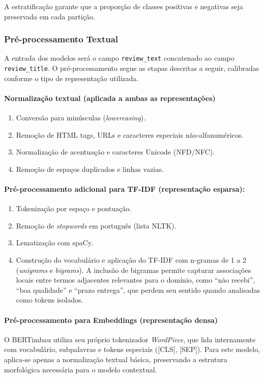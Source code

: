 \documentclass{IEEEtran}
\begin{document}
A estratificação garante que a proporção de classes positivas e negativas seja preservada em cada partição.

\subsubsection{Pré-processamento Textual}
\label{subsubsec:preprocessing}

A entrada dos modelos será o campo \texttt{review\_text} concatenado ao campo \texttt{review\_title}. O pré-processamento segue as etapas descritas a seguir, calibradas conforme o tipo de representação utilizada.

\paragraph{Normalização textual (aplicada a ambas as representações)}
\begin{enumerate}[noitemsep]
  \item Conversão para minúsculas (\textit{lowercasing}).
  \item Remoção de HTML tags, URLs e caracteres especiais não-alfanuméricos.
  \item Normalização de acentuação e caracteres Unicode (NFD/NFC).
  \item Remoção de espaços duplicados e linhas vazias.
\end{enumerate}

\paragraph{Pré-processamento adicional para TF-IDF (representação esparsa):}
\begin{enumerate}[noitemsep]
  \item Tokenização por espaço e pontuação.
  \item Remoção de \textit{stopwords} em português (lista NLTK).
  \item Lematização com spaCy.
  \item Construção do vocabulário e aplicação do TF-IDF com n-gramas de 1 a 2 (\textit{unigrams} e \textit{bigrams}). A inclusão de bigramas permite capturar associações locais entre termos adjacentes relevantes para o domínio, como ``não recebi'', ``boa qualidade'' e ``prazo entrega'', que perdem seu sentido quando analisadas como tokens isolados.
\end{enumerate}

\paragraph{Pré-processamento para Embeddings (representação densa)}
O BERTimbau utiliza seu próprio tokenizador \textit{WordPiece}, que lida internamente com vocabulário, subpalavras e tokens especiais ([CLS], [SEP]). Para este modelo, aplica-se apenas a normalização textual básica, preservando a estrutura morfológica necessária para o modelo contextual.
\end{document}
